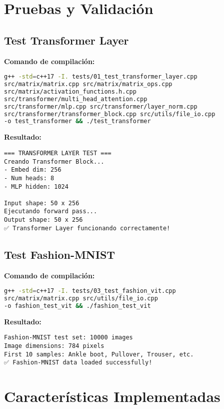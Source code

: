 \documentclass[12pt,a4paper]{article}
\begin{document}
\section{Pruebas y Validación}

\subsection{Test Transformer Layer}

\textbf{Comando de compilación:}
\begin{lstlisting}[language=bash]
g++ -std=c++17 -I. tests/01_test_transformer_layer.cpp 
src/matrix/matrix.cpp src/matrix/matrix_ops.cpp 
src/matrix/activation_functions.h.cpp 
src/transformer/multi_head_attention.cpp 
src/transformer/mlp.cpp src/transformer/layer_norm.cpp 
src/transformer/transformer_block.cpp src/utils/file_io.cpp 
-o test_transformer && ./test_transformer
\end{lstlisting}

\textbf{Resultado:}
\begin{lstlisting}
=== TRANSFORMER LAYER TEST ===
Creando Transformer Block...
- Embed dim: 256
- Num heads: 8
- MLP hidden: 1024

Input shape: 50 x 256
Ejecutando forward pass...
Output shape: 50 x 256
✅ Transformer Layer funcionando correctamente!
\end{lstlisting}

\subsection{Test Fashion-MNIST}

\textbf{Comando de compilación:}
\begin{lstlisting}[language=bash]
g++ -std=c++17 -I. tests/03_test_fashion_vit.cpp 
src/matrix/matrix.cpp src/utils/file_io.cpp 
-o fashion_test_vit && ./fashion_test_vit
\end{lstlisting}

\textbf{Resultado:}
\begin{lstlisting}
Fashion-MNIST test set: 10000 images
Image dimensions: 784 pixels
First 10 samples: Ankle boot, Pullover, Trouser, etc.
✅ Fashion-MNIST data loaded successfully!
\end{lstlisting}

\section{Características Implementadas}
\end{document}
